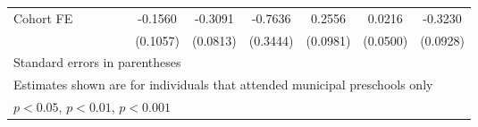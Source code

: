 \begin{table}[htbp]
\begin{tabular}{l*{10}{c}}
\addlinespace
Cohort FE   &                     &                     &                     &                     &     -0.1560         &     -0.3091\sym{***}&     -0.7636\sym{*}  &      0.2556\sym{**} &      0.0216         &     -0.3230\sym{***}\\
            &                     &                     &                     &                     &    (0.1057)         &    (0.0813)         &    (0.3444)         &    (0.0981)         &    (0.0500)         &    (0.0928)         \\
\bottomrule
\multicolumn{11}{l}{\footnotesize Standard errors in parentheses}\\
\multicolumn{11}{l}{\footnotesize Estimates shown are for individuals that attended municipal preschools only}\\
\multicolumn{11}{l}{\footnotesize \sym{*} \(p<0.05\), \sym{**} \(p<0.01\), \sym{***} \(p<0.001\)}\\
\end{tabular}
\end{table}
